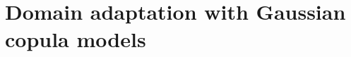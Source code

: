 \documentclass{article}
\begin{document}
\begin{comment}
	
	\sloppy Note that here for convenience we refer $KL( g_T(\boldsymbol{X_T}), g_S(\boldsymbol{X_S})$ as the KL divergence between two underlying densities that generate samples  $g_T(\boldsymbol{X_T})$ and  $g_S(\boldsymbol{X_S})$. Proof for proposition 1 is based on two lemmas.
	
	
	\textbf{Lemma 1 } 
	
	
\begin{equation} \hspace{-0.5em}KL(c_T(u_1,\ldots,u_D), c_S(u_1,\ldots,u_D) ) \leq KL(p_T(x),p_S(y) \end{equation}
	
	\textbf{Lemma 2 } The KL divergence between two probability densities of random variable $x$ is invariant under bijective, monotonic transformations of $x$.
	
	
	Lemma 1 states that under the domain-specific CDF transformation the samples $\boldsymbol{U_T}=F_T(\boldsymbol{X_T}); \boldsymbol{U}_S=F_S(\boldsymbol{X_S})$ are closer than $\boldsymbol{X_T}$ and $\boldsymbol{X_S}$. However $\boldsymbol{U_T}$ and $\boldsymbol{U_S}$ are restricted in a unit hypercube that is hard to model.Therefore we exploit the $\Phi^{-1}$ function and perform one more mapping $\boldsymbol{Z_T}=\Phi^{-1}( \boldsymbol{U_T} );  \boldsymbol{Z_S}=\Phi^{-1}(\boldsymbol{U_S}) $ so that the samples are unbounded while the distribution distance is guaranteed to remain at the same time.
  
  \begin{comment}
    The benefit of the second mapping $\Phi^{-1}$ lies on the second proposition.
	
	\textbf{Proposition 2.} 
	
	If $c_T, c_S$ are Gaussian copula then $\boldsymbol{Z_T}, \boldsymbol{Z_S}$ are multivariate Gaussian distribution with the same mean vector.
	
	
	If we denote $\boldsymbol{R_T},\boldsymbol{R_S}$ in turn are the correlation matrices of $\boldsymbol{Z_T},\boldsymbol{Z_S}$ then the distribution distance between $\boldsymbol{Z_T},\boldsymbol{Z_S}$ can be formulated as the distance between two Gaussians with the same mean and difference correlation matrices $\boldsymbol{R_T},\boldsymbol{R_S}$.
\end{comment}	
	
	
	
	\section{Domain adaptation with Gaussian copula models}\label{sec:model}
	
\end{document}
